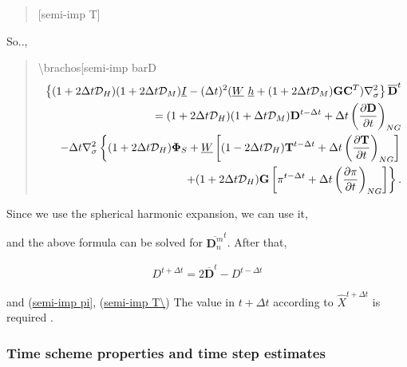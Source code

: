 \begin{quote}
\protect\hypertarget{semi-impux20T}{}{{[}semi-imp T{]}}
\end{quote}

So..,

\begin{quote}
\protect\hypertarget{semi-impux20barD}{}{\textbackslash brachos{[}semi-imp
barD\brachos{]}} \begin{eqnarray}
\left\{ ( 1+2\Delta t {\mathcal D}_H )( 1+2\Delta t {\mathcal D}_M )
\underline{I}  
- ( \Delta t )^{2}  ( \underline{W} \ \underline{h} 
+ (1+2\Delta t {\mathcal D}_M)
\mathbf{G} \mathbf{C}^{T} ) \nabla^{2}_{\sigma}
\right\}
\overline{ \mathbf{D} }^{t} 
\\
= ( 1+2\Delta t {\mathcal D}_H )( 1+\Delta t {\mathcal D}_M ) 
\mathbf{D}^{t-\Delta t}
+ \Delta t 
\left( \frac{\partial \mathbf{D}}{\partial t} \right)_{NG}  
\\
-  \Delta t \nabla^{2}_{\sigma}     
\left\{  ( 1+2\Delta t {\mathcal D}_H ) \mathbf{\Phi}_{S} 
+ \underline{W} 
\left[ ( 1-2\Delta t {\mathcal D}_H ) 
\mathbf{T}^{t-\Delta t}
+ \Delta t 
\left( \frac{\partial \mathbf{T}}
{\partial t}     
\right)_{NG} \right]
\right.
\\
\left.  \hspace*{20mm} 
+ ( 1+2\Delta t {\mathcal D}_H ) \mathbf{G} 
\left[ \pi^{t-\Delta t} 
+ \Delta t
\left( \frac{\partial \pi}
{\partial t} 
\right)_{NG}  \right]
\right\} . 
\end{eqnarray}
\end{quote}

Since we use the spherical harmonic expansion, we can use it,

and the above formula can be solved for
\(\overline{ \mathbf{D}_n^m }^{t}\). After that,

\begin{eqnarray}
   D^{t+\Delta t} = 2\overline{ \mathbf{D} }^{t} - D^{t-\Delta t}
\end{eqnarray}

and (\protect\hyperlink{semi-impux5cux2520pi}{semi-imp pi{]}},
(\protect\hyperlink{semi-impux5cux2520T}{semi-imp T\textbackslash{}})
The value in \(t+\Delta t\) according to \(\hat{X}^{t+\Delta t}\) is
required .

\hypertarget{time-scheme-properties-and-time-step-estimates}{%
\subsubsection{Time scheme properties and time step
estimates}\label{time-scheme-properties-and-time-step-estimates}}

